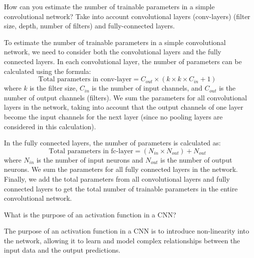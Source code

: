 \begin{ejercicio}
    How can you estimate the number of trainable parameters in a simple convolutional network? Take into account convolutional layers (conv-layers) (filter size, depth, number of filters) and fully-connected layers.

    To estimate the number of trainable parameters in a simple convolutional network, we need to consider both the convolutional layers and the fully connected layers. In each convolutional layer, the number of parameters can be calculated using the formula:
    \[
    \text{Total parameters in conv-layer} = C_{out} \times (k \times k \times C_{in} + 1)
    \]
    where \(k\) is the filter size, \(C_{in}\) is the number of input channels, and \(C_{out}\) is the number of output channels (filters). We sum the parameters for all convolutional layers in the network, taking into account that the output channels of one layer become the input channels for the next layer (since no pooling layers are considered in this calculation).

    In the fully connected layers, the number of parameters is calculated as:
    \[
    \text{Total parameters in fc-layer} = (N_{in} \times N_{out}) + N_{out}
    \]
    where \(N_{in}\) is the number of input neurons and \(N_{out}\) is the number of output neurons. We sum the parameters for all fully connected layers in the network. Finally, we add the total parameters from all convolutional layers and fully connected layers to get the total number of trainable parameters in the entire convolutional network.
\end{ejercicio}


\begin{ejercicio}
    What is the purpose of an activation function in a CNN?

    The purpose of an activation function in a CNN is to introduce non-linearity into the network, allowing it to learn and model complex relationships between the input data and the output predictions.
\end{ejercicio}